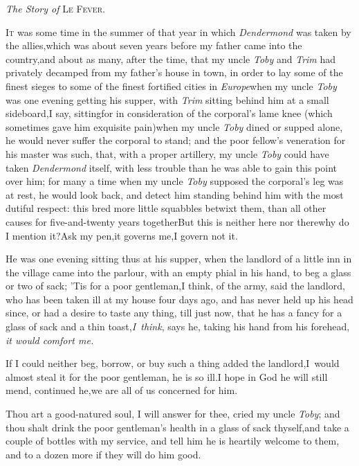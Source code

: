 \documentclass{article}
\begin{document}
\medskip
\centerline{\textit{The Story of} \textsc{Le Fever}.}

\lettrine{I}{t} was some time in the summer of
that year in which \textit{Dendermond} was taken by the
allies,\tsk which was about seven years before my father came
into the country,\tsk and about as many, after the time, that my
uncle \textit{Toby} and \textit{Trim} had privately decamped from my
father’s house in town, in order to lay some of the finest
sieges to some of the finest fortified cities in
\textit{Europe}\tsh when my uncle \textit{Toby} was one
evening getting his supper, with \textit{Trim} sitting behind him at
a small sideboard,\tsk I say, sitting\tsk for
in consideration of the corporal’s lame knee
(which sometimes gave him exqui\-site pain)\tsk when my uncle
\textit{Toby} dined or supped alone, he would never suffer the
corporal to stand; and the poor fellow’s veneration for his
master was such, that, with a proper artillery, my uncle
\textit{Toby} could have taken \textit{Dendermond} itself, with less
trouble than he was able to gain this point over him; for many a
time when my uncle \textit{Toby} supposed the corporal’s leg
was at rest, he would look back, and detect him standing behind him
with the most dutiful respect: this bred more little squabbles
betwixt them, than all other causes for five-and-twenty years
together\tsk But this is neither here nor there\tsk why do I
mention it?\tsh\break Ask my pen,\tsk it governs me,\tsk I
govern not it.

He was one evening sitting thus at his supper, when the landlord
of a little inn in the village came into the parlour, with an
empty phial in his hand, to beg a glass or two of sack; ’Tis for
a poor gentleman,\tsk I think, of the army, said the landlord,
who has been taken ill at my house four days ago, and has never
held up his head since, or had a desire to taste any thing, till
just now, that he has a fancy for a glass of sack and a thin
toast,\tsh \textit{I~think}, says he, taking his hand from his
forehead, \textit{it would comfort me.}\tsh

\tsh If I could neither beg, borrow, or buy such a thing\tsk
added the landlord,\tsk I~would almost steal it for the poor
gentleman, he is so ill.\tsh I hope in God he will still mend,
continued he,\tsk we are all of us concerned for him.

Thou art a good-natured soul, I will answer for thee, cried my
uncle \textit{Toby}; and thou shalt drink the poor gentleman’s
health in a glass of sack thyself,\break\tsk and take a couple of
bottles with my service, and tell him he is heartily welcome to
them, and to a dozen more if they will do him good.
\end{document}
